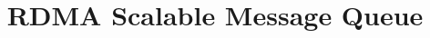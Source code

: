 \documentclass[10pt, conference, compsocconf]{IEEEtran}
\begin{document}
\title{RDMA Scalable Message Queue}
\date{}
\maketitle

\onecolumn



%

% 
% 
\end{document}
